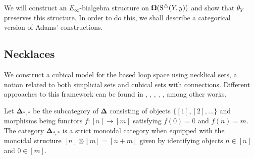 We will construct an $E_{\infty}$-bialgebra structure on $\operatorname{\mathbf{\Omega}}(\operatorname{S^{\triangle}}(Y, y))$ and show that $\theta_Y$ preserves this structure. In order to do this, we shall describe a categorical version of Adams' constructions.





\subsection{Necklaces}

We construct a cubical model for the based loop space using necklical sets, a notion related to both simplicial sets and cubical sets with connections. Different approaches to this framework can be found in \cite{baues1998hopf}, \cite{galvez2020hopf}, \cite{dugger2011rigidification}, \cite{rivera2018cubical}, \cite{rivera2018cubical}, among other works. 

Let $\mathbf{\Delta}_{*,*}$ be the subcategory of $\mathbf{\Delta}$ consisting of objects $\{ [1], [2],\dots\}$ and morphisms being functors $f \colon [n] \to [m]$ satisfying $f(0)=0$ and $f(n)=m$. The category $\mathbf{\Delta}_{*,*}$ is a strict monoidal category when equipped with the monoidal structure $[n] \otimes [m]= [n+m]$ given by identifying objects $n \in [n]$ and $0 \in [m]$.

